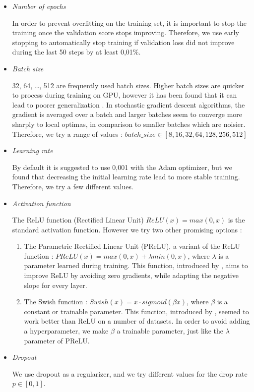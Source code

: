 \documentclass{article}
\begin{document}
\begin{itemize}
    \item \emph{Number of epochs}
    \par
    In order to prevent overfitting on the training set, it is important to stop the training once the validation score stops improving. Therefore, we use early stopping to automatically stop training if validation loss did not improve during the last 50 steps by at least 0,01\%.
    \item \emph{Batch size} \label{section:batch-size}
    \par
    32, 64, \dots, 512 are frequently used batch sizes. Higher batch sizes are quicker to process during training on GPU, however it has been found that it can lead to poorer generalization \cite{keskar2016largebatch}. In stochastic gradient descent algorithms, the gradient is averaged over a batch and larger batches seem to converge more sharply to local optimas, in comparison to smaller batches which are noisier. Therefore, we try a range of values : $batch\_size \in [8, 16, 32, 64, 128, 256, 512]$
    \item \emph{Learning rate}
    \par
    By default it is suggested to use 0,001 with the Adam optimizer, but we found that decreasing the initial learning rate lead to more stable training. Therefore, we try a few different values.
    \item \emph{Activation function} \label{section:act-fct}
    \par
    The ReLU function (Rectified Linear Unit) $ReLU(x) = max(0,x)$ is the standard activation function. However we try two other promising options :
    \begin{enumerate}
        \item The Parametric Rectified Linear Unit (PReLU), a variant of the ReLU function : $PReLU(x) = max(0,x) + \lambda min(0,x)$, where $\lambda$ is a parameter learned during training. This function, introduced by \cite{He_2015-prelu}, aims to improve ReLU by avoiding zero gradients, while adapting the negative slope for every layer.
        \item The Swish function : $Swish(x) = x \cdot sigmoid(\beta x)$, where $\beta$ is a constant or trainable parameter. This function, introduced by \cite{ramach2017-swish}, seemed to work better than ReLU on a number of datasets. In order to avoid adding a hyperparameter, we make $\beta$ a trainable parameter, just like the $\lambda$ parameter of PReLU.
    \end{enumerate}
    \item \emph{Dropout}
    \par
    We use dropout as a regularizer, and we try different values for the drop rate $p \in [0,1]$.
\end{itemize}
\end{document}
